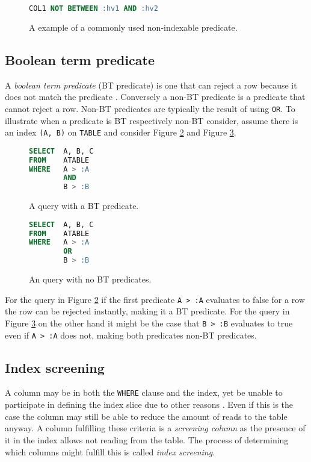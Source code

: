 \begin{figure}[ht]
\begin{lstlisting}[language=SQL]
COL1 NOT BETWEEN :hv1 AND :hv2
\end{lstlisting}
\caption[An example of a non-indexable predicate]{A example of a commonly used non-indexable predicate.}\label{fig:sql:nonindexable}
\end{figure}

\subsection*{Boolean term predicate}
A \textit{boolean term predicate} (BT predicate) is one that can reject a row because it does not match the predicate \cite{lahdenmaki_2005_relational_rdidatodossea}. Conversely a non-BT predicate is a predicate that cannot reject a row. Non-BT predicates are typically the result of using \texttt{OR}. To illustrate when a predicate is BT respectively non-BT consider, assume there is an index \texttt{(A, B)} on \texttt{TABLE} and consider Figure \ref{fig:sql:btpredicate} and Figure \ref{fig:sql:nonbtpredicate}.

\begin{figure}[ht]
\begin{lstlisting}[language=SQL]
SELECT  A, B, C
FROM    ATABLE
WHERE   A > :A
        AND
        B > :B
\end{lstlisting}
\caption[A query containing a BT predicate]{A query with a BT predicate.}\label{fig:sql:btpredicate}
\end{figure}

\begin{figure}[ht]
\begin{lstlisting}[language=SQL]
SELECT  A, B, C
FROM    ATABLE
WHERE   A > :A
        OR
        B > :B
\end{lstlisting}
\caption[A query containing no BT predicates]{An query with no BT predicates.}\label{fig:sql:nonbtpredicate}
\end{figure}

For the query in Figure \ref{fig:sql:btpredicate} if the first predicate \texttt{A > :A} evaluates to false for a row the row can be rejected instantly, making it a BT predicate. For the query in Figure \ref{fig:sql:nonbtpredicate} on the other hand it might be the case that \texttt{B > :B} evaluates to true even if \texttt{A > :A} does not, making both predicates non-BT predicates.

\subsection*{Index screening}
A column may be in both the \texttt{WHERE} clause and the index, yet be unable to participate in defining the index slice due to other reasons \cite{lahdenmaki_2005_relational_rdidatodossea}. Even if this is the case the column may still be able to reduce the amount of reads to the table anyway. A column fulfilling these criteria is a \textit{screening column} as the presence of it in the index allows not reading from the table. The process of determining which columns might fulfill this is called \textit{index screening}.

